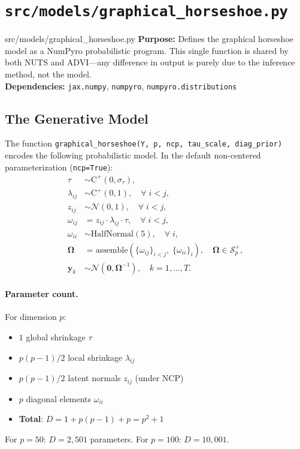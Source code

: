 \documentclass[11pt,a4paper]{article}
\newcommand{\Normal}{\mathcal{N}}
\newcommand{\HalfCauchy}{\mathrm{C}^{+}}
\newcommand{\Spp}{\mathcal{S}^{+}_p}
\newcommand{\bOmega}{\bm{\Omega}}
\begin{document}
\section{\texttt{src/models/graphical\_horseshoe.py}}\label{sec:model}

\begin{filecard}{src/models/graphical\_horseshoe.py}
\textbf{Purpose:} Defines the graphical horseshoe model as a NumPyro probabilistic program.  This single function is shared by both NUTS and ADVI---any difference in output is purely due to the inference method, not the model.
\\[0.3em]
\textbf{Dependencies:} \texttt{jax.numpy}, \texttt{numpyro}, \texttt{numpyro.distributions}
\end{filecard}

\subsection{The Generative Model}

The function \texttt{graphical\_horseshoe(Y, p, ncp, tau\_scale, diag\_prior)} encodes the following probabilistic model.  In the default non-centered parameterization (\texttt{ncp=True}):
\begin{align}
  \tau &\sim \HalfCauchy(0, \sigma_\tau), \label{eq:tau}\\
  \lambda_{ij} &\sim \HalfCauchy(0, 1), \quad \forall\; i < j, \label{eq:lambda}\\
  z_{ij} &\sim \Normal(0, 1), \quad \forall\; i < j, \label{eq:z}\\
  \omega_{ij} &= z_{ij} \cdot \lambda_{ij} \cdot \tau, \quad \forall\; i < j, \label{eq:omega_offdiag}\\
  \omega_{ii} &\sim \text{HalfNormal}(5), \quad \forall\; i, \label{eq:omega_diag}\\
  \bOmega &= \text{assemble}(\{\omega_{ij}\}_{i<j},\; \{\omega_{ii}\}_i), \quad \bOmega \in \Spp, \label{eq:assemble}\\
  \bm{y}_k &\sim \Normal(\bm{0}, \bOmega^{-1}), \quad k = 1,\ldots, T. \label{eq:lik}
\end{align}

\paragraph{Parameter count.} For dimension $p$:
\begin{itemize}[nosep]
  \item $1$ global shrinkage $\tau$
  \item $p(p{-}1)/2$ local shrinkage $\lambda_{ij}$
  \item $p(p{-}1)/2$ latent normals $z_{ij}$ (under NCP)
  \item $p$ diagonal elements $\omega_{ii}$
  \item \textbf{Total}: $D = 1 + p(p{-}1) + p = p^2 + 1$
\end{itemize}
For $p=50$: $D = 2{,}501$ parameters.  For $p=100$: $D = 10{,}001$.
\end{document}
